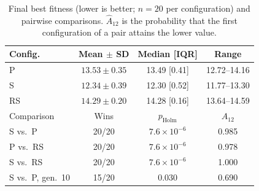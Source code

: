 \documentclass[sigconf]{acmart}
\begin{document}
\begin{table}[t]
  \caption{Final best fitness (lower is better; $n = 20$ per configuration) and pairwise comparisons. $\hat{A}_{12}$ is the probability that the first configuration of a pair attains the lower value.}
  \label{tab:results}
  \small
  \centering
  \begin{tabular}{@{}lccc@{}}
    \toprule
    Config. & Mean $\pm$ SD & Median [IQR] & Range \\
    \midrule
    P  & $13.53 \pm 0.35$ & 13.49 [0.41] & 12.72--14.16 \\
    S  & $12.34 \pm 0.39$ & 12.30 [0.52] & 11.77--13.30 \\
    RS & $14.29 \pm 0.20$ & 14.28 [0.16] & 13.64--14.59 \\
    \midrule
    Comparison & Wins & $p_\text{Holm}$ & $\hat{A}_{12}$ \\
    \midrule
    S vs.\ P  & 20/20 & $7.6\times10^{-6}$ & 0.985 \\
    P vs.\ RS & 20/20 & $7.6\times10^{-6}$ & 0.978 \\
    S vs.\ RS & 20/20 & $7.6\times10^{-6}$ & 1.000 \\
    S vs.\ P, gen.~10 & 15/20 & $0.030$ & 0.690 \\
    \bottomrule
  \end{tabular}
\end{table}
\end{document}

